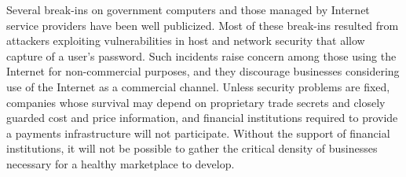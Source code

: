 Several break-ins on government computers and those managed by Internet
service providers have been well publicized. Most of these break-ins
resulted from attackers exploiting vulnerabilities in host and network
security that allow capture of a user's password. Such incidents raise
concern among those using the Internet for non-commercial purposes, and
they discourage businesses considering use of the Internet as a
commercial channel. Unless security problems are fixed, companies whose
survival may depend on proprietary trade secrets and closely guarded
cost and price information, and financial institutions required to
provide a payments infrastructure will not participate. Without the
support of financial institutions, it will not be possible to gather
the critical density of businesses necessary for a healthy marketplace
to develop.
